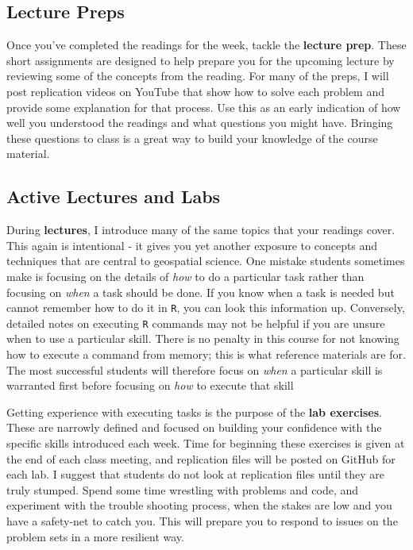 \documentclass[]{book}
\theoremstyle{definition}
\theoremstyle{definition}
\theoremstyle{definition}
\theoremstyle{remark}
\begin{document}
\subsection{Lecture Preps}\label{lecture-preps}

Once you've completed the readings for the week, tackle the
\textbf{lecture prep}. These short assignments are designed to help
prepare you for the upcoming lecture by reviewing some of the concepts
from the reading. For many of the preps, I will post replication videos
on YouTube that show how to solve each problem and provide some
explanation for that process. Use this as an early indication of how
well you understood the readings and what questions you might have.
Bringing these questions to class is a great way to build your knowledge
of the course material.

\subsection{Active Lectures and Labs}\label{active-lectures-and-labs}

During \textbf{lectures}, I introduce many of the same topics that your
readings cover. This again is intentional - it gives you yet another
exposure to concepts and techniques that are central to geospatial
science. One mistake students sometimes make is focusing on the details
of \emph{how} to do a particular task rather than focusing on
\emph{when} a task should be done. If you know when a task is needed but
cannot remember how to do it in \texttt{R}, you can look this
information up. Conversely, detailed notes on executing \texttt{R}
commands may not be helpful if you are unsure when to use a particular
skill. There is no penalty in this course for not knowing how to execute
a command from memory; this is what reference materials are for. The
most successful students will therefore focus on \emph{when} a
particular skill is warranted first before focusing on \emph{how} to
execute that skill

Getting experience with executing tasks is the purpose of the
\textbf{lab exercises}. These are narrowly defined and focused on
building your confidence with the specific skills introduced each week.
Time for beginning these exercises is given at the end of each class
meeting, and replication files will be posted on GitHub for each lab. I
suggest that students do not look at replication files until they are
truly stumped. Spend some time wrestling with problems and code, and
experiment with the trouble shooting process, when the stakes are low
and you have a safety-net to catch you. This will prepare you to respond
to issues on the problem sets in a more resilient way.
\end{document}
